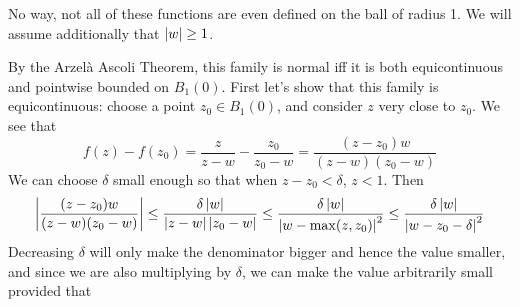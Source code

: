\documentclass{homework}
\begin{document}
                                                                                                                                                      \begin{solution}
                                                                                                                                                      No way, not all of these functions are even defined on the ball of radius 1. We will assume additionally that $\left|w\right|\geq 1$.

                                                                                                                                                      By the Arzel\`a Ascoli Theorem, this family is normal iff it is both equicontinuous and pointwise bounded on $B_1(0)$. First let's show that this family is equicontinuous: choose a point $z_0\in B_1(0)$, and consider $z$ very close to $z_0$. We see that
                                                                                                                                                      \[
                                                                                                                                                      f(z)-f(z_0) = \frac{z}{z-w} - \frac{z_0}{z_0-w} = \frac{(z-z_0)w}{(z-w)(z_0-w)}
                                                                                                                                                      \]
                                                                                                                                                      We can choose $\delta$ small enough so that when $z-z_0<\delta$, $z < 1$. Then
                                                                                                                                                      \[
                                                                                                                                                      \left|\frac{(z-z_0)w}{(z-w)(z_0-w)}\right|\leq \frac{\delta \left|w\right|}{\left|z-w\right|\left|z_0-w\right|} \leq \frac{\delta \left|w\right|}{\left|w-\max(z, z_0)\right|^2}  \leq \frac{\delta \left|w\right|}{\left|w-z_0-\delta\right|^2}
                                                                                                                                                      \]
                                                                                                                                                      Decreasing $\delta$ will only make the denominator bigger and hence the value smaller, and since we are also multiplying by $\delta$, we can make the value arbitrarily small provided that

\end{solution}
\end{document}
